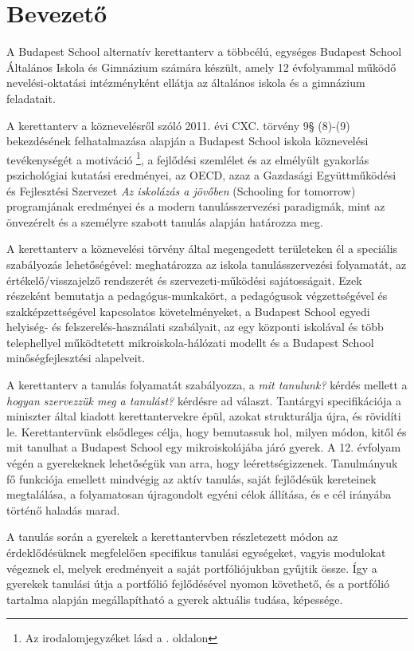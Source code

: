 \chapter{Bevezető}
A Budapest School alternatív kerettanterv a többcélú, egységes	Budapest School
Általános Iskola és Gimnázium számára készült, amely 12 évfolyammal működő
nevelési-oktatási intézményként ellátja az általános iskola és a gimnázium
feladatait.

A kerettanterv a köznevelésről szóló 2011. évi CXC. törvény 9§ (8)-(9)
bekezdésének felhatalmazása alapján a Budapest School iskola köznevelési
tevékenységét a motiváció \citep{pink2011drive}\footnote{Az irodalomjegyzéket
    lásd a \pageref{sec:bibliographyk}. oldalon}, a fejlődési szemlélet
\citep{growthmindset} és az elmélyült gyakorlás \citep{ericsson2016peak}
pszichológiai kutatási eredményei, az  OECD, azaz a Gazdasági Együttműködési és
Fejlesztési Szervezet \emph{Az iskolázás a jövőben}  (Schooling for tomorrow)
programjának eredményei \citep{2006schooling}
és a modern tanulásszervezési paradigmák, mint az önvezérelt
\citep{mitra2012beyond} és a személyre szabott \citep{khan2012one} tanulás
alapján határozza meg.

A kerettanterv a köznevelési törvény által megengedett területeken él a
speciális szabályozás lehetőségével: meghatározza az iskola tanulásszervezési
folyamatát, az értékelő/visszajelző rendszerét és szervezeti-működési
sajátosságait. Ezek részeként bemutatja a pedagógus-munkakört, a pedagógusok
végzettségével és szakképzettségével kapcsolatos követelményeket, a Budapest
School	egyedi helyiség- és felszerelés-használati szabályait, az egy központi
iskolával és több telephellyel működtetett mikroiskola-hálózati modellt és a
Budapest School minőségfejlesztési alapelveit.

A kerettanterv	a tanulás folyamatát szabályozza, a \emph{mit tanulunk?} kérdés
mellett a \emph{hogyan szervezzük meg a tanulást?} kérdésre ad választ.
Tantárgyi specifikációja a miniszter által kiadott kerettantervekre
\citep{ofi:kerettanterv} épül, azokat strukturálja újra, és rövidíti le.
Kerettantervünk elsődleges célja, hogy bemutassuk hol, milyen módon, kitől és
mit tanulhat a Budapest School egy mikroiskolájába járó gyerek. A 12. évfolyam
végén a gyerekeknek lehetőségük van arra, hogy leérettségizzenek. Tanulmányuk
fő funkciója emellett mindvégig az aktív tanulás, saját fejlődésük kereteinek
megtalálása, a folyamatosan újragondolt egyéni célok állítása, és e cél
irányába történő haladás marad.

A tanulás során a gyerekek a kerettantervben részletezett módon az
érdeklődésüknek megfelelően specifikus tanulási egységeket, vagyis modulokat
végeznek el, melyek eredményeit a saját portfóliójukban gyűjtik össze. Így a
gyerekek tanulási útja a portfólió fejlődésével nyomon követhető, és a
portfólió tartalma alapján megállapítható a gyerek aktuális tudása, képessége.

